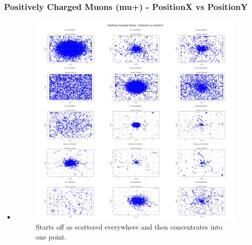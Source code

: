 \documentclass[aspectratio-169]{beamer}
\begin{document}
\begin{frame}
\frametitle{Positively Charged Muons (mu+) - PositionX vs PositionY}
\begin{itemize}
    \item 
    \begin{minipage}{0.5\textwidth}
        \begin{figure}
            \centering
            \includegraphics[width=\textwidth]{Combined Plots/PositionX_vs_PositionY_mu+.png}
                \footnotesize{Starts off as scattered everywhere and then concentrates into one point.}
        \end{figure}
    \end{minipage}
\end{itemize}
\end{frame}

\end{document}
